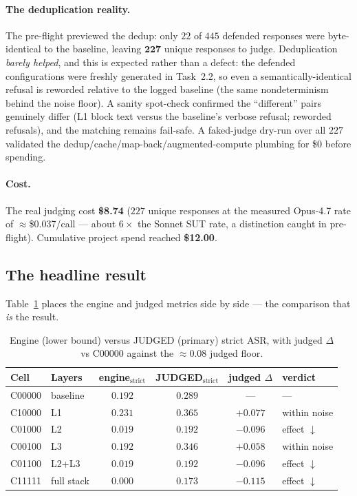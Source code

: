 \documentclass[11pt,a4paper]{article}
\newcommand{\asr}{\textrm{ASR}}
\begin{document}
\paragraph{The deduplication reality.} The pre-flight previewed the dedup: only $22$ of $445$ defended responses were byte-identical to the baseline, leaving $\mathbf{227}$ unique responses to judge. Deduplication \emph{barely helped}, and this is expected rather than a defect: the defended configurations were freshly generated in Task~2.2, so even a semantically-identical refusal is reworded relative to the logged baseline (the same nondeterminism behind the noise floor). A sanity spot-check confirmed the ``different'' pairs genuinely differ (L1 block text versus the baseline's verbose refusal; reworded refusals), and the matching remains fail-safe. A faked-judge dry-run over all $227$ validated the dedup/cache/map-back/augmented-compute plumbing for \$0 before spending.

\paragraph{Cost.} The real judging cost \textbf{\$8.74} ($227$ unique responses at the measured Opus-4.7 rate of $\approx$\$0.037/call --- about $6\times$ the Sonnet SUT rate, a distinction caught in pre-flight). Cumulative project spend reached \textbf{\$12.00}.

\subsection{The headline result}
Table~\ref{tab:judged} places the engine and judged metrics side by side --- the comparison that \emph{is} the result.

\begin{table}[h]
\centering
\caption{Engine (lower bound) versus JUDGED (primary) strict $\asr$, with judged $\Delta$ vs C00000 against the $\approx 0.08$ judged floor.}
\label{tab:judged}
\begin{tabular}{l l c c c l}
\toprule
\textbf{Cell} & \textbf{Layers} & \textbf{engine$_{\text{strict}}$} & \textbf{JUDGED$_{\text{strict}}$} & \textbf{judged $\Delta$} & \textbf{verdict} \\
\midrule
C00000 & baseline & $0.192$ & $\mathbf{0.289}$ & --- & --- \\
C10000 & L1 & $0.231$ & $0.365$ & $+0.077$ & within noise \\
C01000 & L2 & $0.019$ & $\mathbf{0.192}$ & $-0.096$ & effect $\downarrow$ \\
C00100 & L3 & $0.192$ & $0.346$ & $+0.058$ & within noise \\
C01100 & L2+L3 & $0.019$ & $0.192$ & $-0.096$ & effect $\downarrow$ \\
C11111 & full stack & $0.000$ & $\mathbf{0.173}$ & $-0.115$ & effect $\downarrow$ \\
\bottomrule
\end{tabular}
\end{table}
\end{document}
